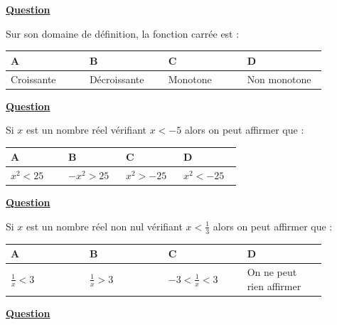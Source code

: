 \documentclass[oneside,12pt]{article}
\begin{document}
\underline{\textbf{Question }}

Sur son domaine de définition, la fonction carrée est :

\begin{center}
	\renewcommand{\arraystretch}{1.35}
	\begin{tabular}{| P{0.22\linewidth} | P{0.22\linewidth} | P{0.22\linewidth} | P{0.22\linewidth} |} \hline
	A & B & C & D \\ \hline
	Croissante & Décroissante & Monotone & Non monotone \\ \hline
	\end{tabular}
\end{center}



\underline{\textbf{Question }}

Si $x$ est un nombre réel vérifiant $x < -5$ alors on peut affirmer que :

\begin{center}
	\renewcommand{\arraystretch}{1.35}
	\begin{tabular}{| P{0.22\linewidth} | P{0.22\linewidth} | P{0.22\linewidth} | P{0.22\linewidth} |} \hline
	A & B & C & D \\ \hline
	\rule{0pt}{5mm}
	$x^2 < 25$ & $- x^2 > 25$ & $x^2 > -25$ & $ x^2 < -25$ \\ \hline
	\end{tabular}
\end{center}



\underline{\textbf{Question }}

Si $x$ est un nombre réel non nul vérifiant $x < \frac{1}{3}$ alors on peut affirmer que :

\begin{center}
	\renewcommand{\arraystretch}{1.35}
	\begin{tabular}{| P{0.22\linewidth} | P{0.22\linewidth} | P{0.22\linewidth} | P{0.22\linewidth} |} \hline
	A & B & C & D \\ \hline
	\vspace*{-5pt} $\frac{1}{x} < 3$ & \vspace*{-5pt} $\frac{1}{x} > 3 $ & \vspace*{-5pt} $-3 < \frac{1}{x} < 3$ & On ne peut rien affirmer \\ \hline
	\end{tabular}
\end{center}



\underline{\textbf{Question }}
\end{document}
